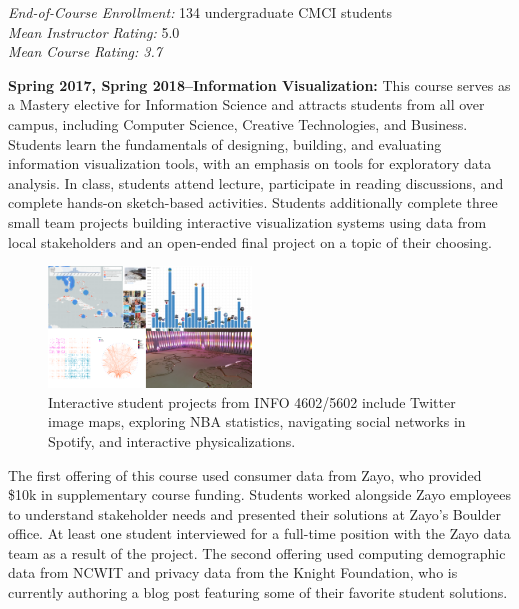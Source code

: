 \documentclass[11pt]{article}
\begin{document}
\emph{End-of-Course Enrollment: }134 undergraduate CMCI students\\
\emph{Mean Instructor Rating:} 5.0\\
\emph{Mean Course Rating: 3.7} 

\textbf{Spring 2017, Spring 2018--Information Visualization: } 
This course serves as a Mastery elective for Information Science and attracts students from all over campus, including Computer Science, Creative Technologies, and Business. Students learn the fundamentals of designing, building, and evaluating information visualization tools, with an emphasis on tools for exploratory data analysis. In class, students attend lecture, participate in reading discussions, and complete hands-on sketch-based activities. Students additionally complete three small team projects building interactive visualization systems using data from local stakeholders and an open-ended final project on a topic of their choosing. 

\begin{figure}
	\begin{center}
		\includegraphics[width=0.48\textwidth]{FlyerImage}
	\end{center}
	\caption{Interactive student projects from INFO 4602/5602 include Twitter image maps, exploring NBA statistics, navigating social networks in Spotify, and interactive physicalizations.}
\end{figure}

The first offering of this course used consumer data from Zayo, who provided \$10k in supplementary course funding. Students worked alongside Zayo employees to understand stakeholder needs and presented their solutions at Zayo's Boulder office. At least one student interviewed for a full-time position with the Zayo data team as a result of the project. The second offering used computing demographic data from NCWIT and privacy data from the Knight Foundation, who is currently authoring a blog post featuring some of their favorite student solutions. 
\end{document}
